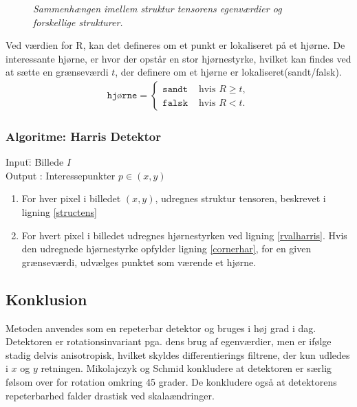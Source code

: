 \begin{enumerate}
{\begin{figure}[H]
     \vspace{-1em}
    \begin{center}    
       \caption{{\footnotesize \textit{Sammenhængen imellem struktur tensorens egenværdier og forskellige strukturer.}}}
    \label{fig:egen}
     \end{center}
     \vspace{-2.5em}
  \end{figure} \noindent
Ved værdien for R, kan det defineres om et punkt er lokaliseret på et hjørne. De interessante hjørne, er hvor der opstår en stor hjørnestyrke, hvilket kan findes ved at sætte en grænseværdi $t$, der definere om et hjørne er lokaliseret(sandt/falsk).
\begin{equation}
\begin{split}
\texttt{hjørne} = 
\begin{cases}
\texttt{sandt}& \text{hvis } R\geq t, \\
\texttt{falsk }& \text{hvis } R < t.
\end{cases}
\end{split}
\label{cornerhar}
\end{equation}
}
\end{enumerate}
\subsubsection*{Algoritme: Harris Detektor}
\begin{tabbing}
Input\quad \= : \= Billede $I$\\
Output \text{ } \> : \> Interessepunkter $p \in (x,y)$
\end{tabbing}
\begin{enumerate}
\item{For hver pixel i billedet $(x,y)$, udregnes struktur tensoren, beskrevet i ligning \eqref{structens}}
\item{For hvert pixel i billedet udregnes hjørnestyrken ved ligning \eqref{rvalharris}.  Hvis den udregnede hjørnestyrke opfylder ligning \ref{cornerhar}, for en given grænseværdi, udvælges punktet som værende et hjørne.}
\end{enumerate}
\subsection*{Konklusion}
Metoden anvendes som en repeterbar detektor og bruges i høj grad i dag. Detektoren er rotationsinvariant pga. dens brug af egenværdier, men er ifølge \cite{eval} stadig delvis anisotropisk, hvilket skyldes differentierings filtrene, der kun udledes i $x$ og $y$ retningen. Mikolajczyk og Schmid \cite{eval1} konkludere at detektoren er særlig følsom over for rotation omkring 45 grader. De konkludere også at detektorens repeterbarhed falder drastisk ved skalaændringer.